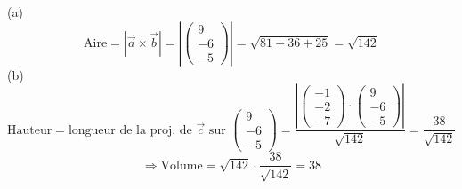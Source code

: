 \documentclass{article}
\begin{document}
(a)
\[ \text{Aire} = |\vec{a} \times \vec{b}| = \left|\begin{pmatrix} 9 \\ -6 \\ -5 \end{pmatrix}\right| = \sqrt{81 + 36 + 25} = \sqrt{142} \]
(b)
\[ \text{Hauteur} = \text{longueur de la proj. de } \vec{c} \text{ sur } \begin{pmatrix} 9 \\ -6 \\ -5 \end{pmatrix} = \frac{\left|\begin{pmatrix} -1 \\ -2 \\ -7 \end{pmatrix} \cdot \begin{pmatrix} 9 \\ -6 \\ -5 \end{pmatrix}\right|}{\sqrt{142}} = \frac{38}{\sqrt{142}} \]
\[ \Rightarrow \text{Volume} = \sqrt{142} \cdot \frac{38}{\sqrt{142}} = 38 \]
\end{document}
